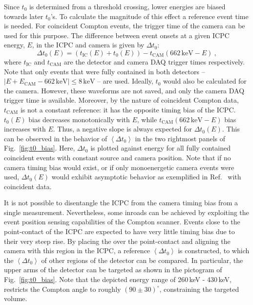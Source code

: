 Since $t_0$ is determined from a threshold crossing, lower energies are biased towards later $t_0$'s. To calculate the magnitude of this effect a reference event time is needed. For coincident Compton events, the trigger time of the camera can be used for this purpose. The difference between event onsets at a given ICPC energy, $E$, in the ICPC and camera is given by $\Delta t_0$:
\begin{equation}
	\Delta t_0(E) = (t_\text{IC}(E) + t_0(E)) - t_\text{CAM}(662\,\text{keV} - E)~,
	\label{eq:t0_bias}
\end{equation}
where $t_\text{IC}$ and $t_\text{CAM}$ are the detector and camera DAQ trigger times respectively. Note that only events that were fully contained in both detectors -- $\left|E + E_\text{CAM} - 662\,\text{keV}\right| \leq 8\,\text{keV}$ -- are used. Ideally, $t_0$ would also be calculated for the camera. However, these waveforms are not saved, and only the camera DAQ trigger time is available. Moreover, by the nature of coincident Compton data, $t_\text{CAM}$ is not a constant reference: it has the opposite timing bias of the ICPC. $t_0(E)$ bias decreases monotonically with $E$, while $t_\text{CAM}(662\,\text{keV} - E)$ bias increases with $E$. Thus, a negative slope is always expected for $\Delta t_0(E)$. This can be observed in the behavior of $\left< \Delta t_0 \right>$ in the two rightmost panels of Fig.~\ref{fig:t0_bias}. Here, $\Delta t_0$ is plotted against energy for all fully contained coincident events with constant \CsS{} source and camera position.  Note that if no camera timing bias would exist, or if only monoenergetic camera events were used, $\Delta t_0(E)$ would exhibit asymptotic behavior as exemplified in Ref.~\cite{mjd_charge_trapping} with coincident \ThS{} data.

It is not possible to disentangle the ICPC from the camera timing bias from a single measurement. Nevertheless, some inroads can be achieved by exploiting the event position sensing capabilities of the Compton scanner. Events close to the point-contact of the ICPC are expected to have very little timing bias due to their very steep rise. By placing the \CsS{} over the point-contact and aligning the camera with this region in the ICPC, a reference $\left< \Delta t_0 \right>$ is constructed, to which the $\left< \Delta t_0 \right>$ of other regions of the detector can be compared. In particular, the upper arms of the detector can be targeted as shown in the pictogram of Fig.~\ref{fig:t0_bias}. Note that the depicted energy range of 260\,keV - 430\,keV, restricts the Compton angle to roughly $(90\pm30)^\circ$, constraining the targeted volume.

